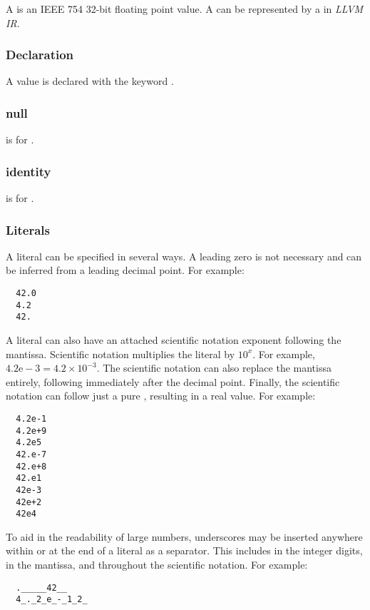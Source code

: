 \documentclass[types.tex]{subfiles}
\begin{document}
A  is an IEEE 754 32-bit floating point value. A  can be represented by a
 in \textit{LLVM IR}.

\subsubsection{Declaration}
\label{sssec:real_decl}
A  value is declared with the keyword .

\subsubsection{null}
\label{sssec:real_null}
 is  for .

\subsubsection{identity}
\label{sssec:real_ident}
 is  for .

\subsubsection{Literals}
\label{sssec:real_lit}
A  literal can be specified in several ways. A leading zero is not necessary and can be
inferred from a leading decimal point. For example:
\begin{lstlisting}
  42.0
  4.2
  42.
\end{lstlisting}

A  literal can also have an attached scientific notation exponent following the mantissa.
Scientific notation multiplies the literal by ${10}^{x}$. For example, $4.2\mathrm{e}-3=4.2
\times10^{-3}$. The scientific notation can also replace the mantissa entirely, following
immediately after the decimal point. Finally, the scientific notation can follow just a pure
, resulting in a real value. For example:
\begin{lstlisting}
  4.2e-1
  4.2e+9
  4.2e5
  42.e-7
  42.e+8
  42.e1
  42e-3
  42e+2
  42e4
\end{lstlisting}

To aid in the readability of large numbers, underscores may be inserted anywhere within or at the
end of a  literal as a separator. This includes in the integer digits, in the mantissa,
and throughout the scientific notation. For example:
\begin{lstlisting}
  ._____42__
  4_._2_e_-_1_2_
\end{lstlisting}
\end{document}
